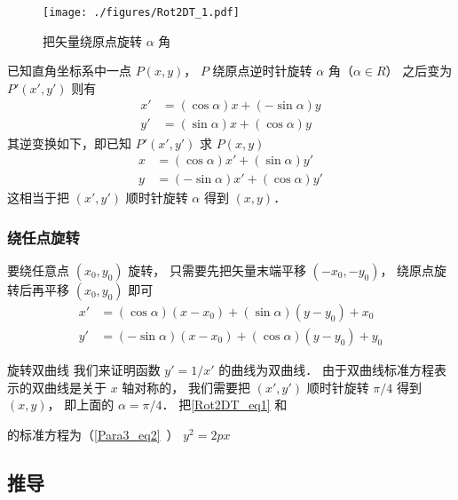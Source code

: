 

\begin{figure}[ht]
\centering
\texttt{[image: ./figures/Rot2DT\_1.pdf]}
\caption{把矢量绕原点旋转 $\alpha$ 角} \label{Rot2DT_fig1}
\end{figure}

已知直角坐标系中一点 $P(x,y)$， $P$ 绕原点逆时针旋转 $\alpha $ 角（$\alpha  \in R$） 之后变为 $P'(x',y')$ 则有
\begin{align}\label{Rot2DT_eq1}
x' &= (\cos \alpha)x + (- \sin \alpha)y \\
\label{Rot2DT_eq2}
y' &= (\sin \alpha)x + (\cos \alpha)y
\end{align}
其逆变换如下，即已知 $P'(x',y')$ 求 $P(x,y)$ 
\begin{align}\label{Rot2DT_eq3}
x &= ( \cos \alpha  )x' + ( \sin \alpha  )y' \\
\label{Rot2DT_eq4}
y &= ( - \sin \alpha)x' + ( \cos \alpha )y'
\end{align}
这相当于把 $(x', y')$ 顺时针旋转 $\alpha$ 得到 $(x, y)$．

\subsubsection{绕任点旋转}
要绕任意点 $(x_0, y_0)$ 旋转， 只需要先把矢量末端平移 $(-x_0, -y_0)$， 绕原点旋转后再平移 $(x_0, y_0)$ 即可
\begin{equation}\label{Rot2DT_eq5}
\begin{aligned}
x' &= ( \cos \alpha  )(x-x_0) + ( \sin \alpha  )(y-y_0) + x_0 \\
y' &= ( - \sin \alpha)(x-x_0) + ( \cos \alpha )(y-y_0) + y_0
\end{aligned}
\end{equation}

\begin{example}{旋转双曲线}
我们来证明函数 $y' = 1/x'$ 的曲线为双曲线． 由于双曲线标准方程表示的双曲线是关于 $x$ 轴对称的， 我们需要把 $(x', y')$ 顺时针旋转 $\pi/4$ 得到 $(x, y)$， 即上面的 $\alpha = \pi/4$． 把\autoref{Rot2DT_eq1} 和




的标准方程为（\autoref{Para3_eq2}~） $y^2 = 2px$
\end{example}

\subsection{推导}

